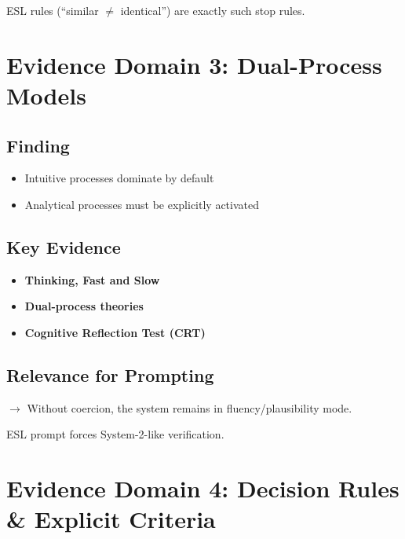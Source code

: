 \documentclass[11pt,a4paper]{article}
\begin{document}
\begin{keypoint}
ESL rules (``similar $\neq$ identical'') are exactly such stop rules.
\end{keypoint}


\section{Evidence Domain 3: Dual-Process Models}

\subsection{Finding}

\begin{itemize}
    \item Intuitive processes dominate by default
    \item Analytical processes must be explicitly activated
\end{itemize}

\subsection{Key Evidence}

\begin{itemize}
    \item \textbf{Thinking, Fast and Slow} \citep{kahneman2011thinking}
    \item \textbf{Dual-process theories} \citep{evans2013dual}
    \item \textbf{Cognitive Reflection Test (CRT)} \citep{frederick2005cognitive}
\end{itemize}

\subsection{Relevance for Prompting}

$\rightarrow$ Without coercion, the system remains in fluency/plausibility mode.

\begin{keypoint}
ESL prompt forces System-2-like verification.
\end{keypoint}


\section{Evidence Domain 4: Decision Rules \& Explicit Criteria}
\end{document}
